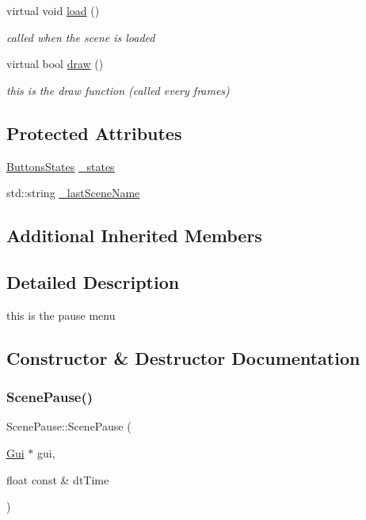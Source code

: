 \begin{DoxyCompactItemize}
\mbox{\label{class_scene_pause_a93b6c99a9d85d4a387b10d8b59b81995}} 
virtual void \hyperlink{class_scene_pause_a93b6c99a9d85d4a387b10d8b59b81995}{load} ()
\begin{DoxyCompactList}\small\item\em called when the scene is loaded \end{DoxyCompactList}\item 
virtual bool \hyperlink{class_scene_pause_aa59d21ea311bab5163574441f3960734}{draw} ()
\begin{DoxyCompactList}\small\item\em this is the draw function (called every frames) \end{DoxyCompactList}\end{DoxyCompactItemize}
\subsection*{Protected Attributes}
\begin{DoxyCompactItemize}
\item 
\hyperlink{struct_scene_pause_1_1_buttons_states}{Buttons\+States} \hyperlink{class_scene_pause_ad4b208838d17f4f584e9bb592314425b}{\+\_\+states}
\item 
std\+::string \hyperlink{class_scene_pause_a039f8c0c94692dc50f8ef6f6f4284b9b}{\+\_\+last\+Scene\+Name}
\end{DoxyCompactItemize}
\subsection*{Additional Inherited Members}


\subsection{Detailed Description}
this is the pause menu 

\subsection{Constructor \& Destructor Documentation}
\mbox{\label{class_scene_pause_adc7025caea876459a8429ffffd02f8b7}} 
\subsubsection{\texorpdfstring{Scene\+Pause()}{ScenePause()}\hspace{0.1cm}{\footnotesize\ttfamily [1/2]}}
{\footnotesize\ttfamily Scene\+Pause\+::\+Scene\+Pause (\begin{DoxyParamCaption}\item[{\hyperlink{class_gui}{Gui} $\ast$}]{gui,  }\item[{float const \&}]{dt\+Time }\end{DoxyParamCaption})}



